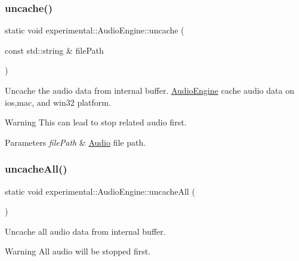 \subsubsection{\texorpdfstring{uncache()}{uncache()}\hspace{0.1cm}{\footnotesize\ttfamily [2/2]}}
{\footnotesize\ttfamily static void experimental\+::\+Audio\+Engine\+::uncache (\begin{DoxyParamCaption}\item[{const std\+::string \&}]{file\+Path }\end{DoxyParamCaption})\hspace{0.3cm}{\ttfamily [static]}}

Uncache the audio data from internal buffer. \hyperlink{classexperimental_1_1AudioEngine}{Audio\+Engine} cache audio data on ios,mac, and win32 platform.

\begin{DoxyWarning}{Warning}
This can lead to stop related audio first. 
\end{DoxyWarning}

\begin{DoxyParams}{Parameters}
{\em file\+Path} & \hyperlink{classAudio}{Audio} file path. \\
\hline
\end{DoxyParams}
\mbox{\label{classexperimental_1_1AudioEngine_acd68e5058545e8daf10e28c5e66e8ef5}} 
\subsubsection{\texorpdfstring{uncache\+All()}{uncacheAll()}\hspace{0.1cm}{\footnotesize\ttfamily [1/2]}}
{\footnotesize\ttfamily static void experimental\+::\+Audio\+Engine\+::uncache\+All (\begin{DoxyParamCaption}{ }\end{DoxyParamCaption})\hspace{0.3cm}{\ttfamily [static]}}

Uncache all audio data from internal buffer.

\begin{DoxyWarning}{Warning}
All audio will be stopped first. 
\end{DoxyWarning}
\mbox{\label{classexperimental_1_1AudioEngine_acd68e5058545e8daf10e28c5e66e8ef5}} 
